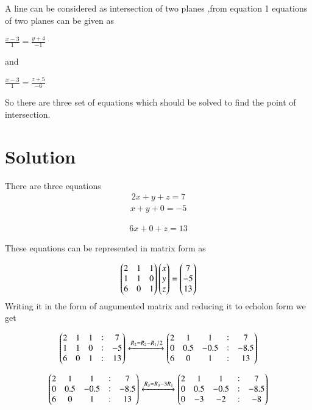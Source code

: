 \documentclass[journal,12pt,twocolumn]{IEEEtran}
\begin{document}
A line can be considered as intersection of two planes ,from equation 1 equations of two planes can be given as
\begin{center}
$\frac{x-3}{1} = \frac{y+4}{-1}$\label{eq:2}
\end{center}

and
\begin{center}
$\frac{x-3}{1} = \frac{z+5}{-6}$\label{eq:3}
\end{center}
So there are three set of equations which should be solved to find the point of intersection.





\section{Solution}
There are three equations 
\begin{align}
2x+y+z=7\label{eq:1}
\end{align}
\begin{align}
x+y+0=-5    \label{eq:2}
\end{align}
    
\begin{align}
6x+0+z=13\label{eq:3}
\end{align}

These equations can be represented in matrix form as

\begin{align}
\begin{pmatrix}2 & 1 & 1 \\ 1 & 1 & 0\\6 & 0 &1\end{pmatrix}\begin{pmatrix}x\\y\\z\end{pmatrix}=\begin{pmatrix}7\\-5\\13\end{pmatrix}
\end{align}	
Writing it in the form of augumented matrix and reducing it to echolon form we get

\begin{align}
\begin{pmatrix}2 & 1 & 1 & :& 7\\ 1 & 1 & 0 & : & -5\\6 & 0 & 1 & : & 13\end{pmatrix} \xleftrightarrow{R_2=R_2-R_1/2}\begin{pmatrix}2 & 1 & 1 & : & 7\\0 & 0.5 & -0.5 & : & -8.5\\ 6 & 0 & 1 & : & 13 \end{pmatrix}	
\end{align}


\begin{align}
\begin{pmatrix}2 & 1 & 1 & : & 7\\0 & 0.5 & -0.5 & : & -8.5\\ 6 & 0 & 1 & : & 13 \end{pmatrix}\xleftrightarrow{R_3=R_3-3R_1}\begin{pmatrix}2 & 1 & 1 & : & 7\\0 & 0.5 & -0.5 & : & -8.5\\ 0 & -3 & -2 & : & -8 \end{pmatrix}    
\end{align}
\end{document}
